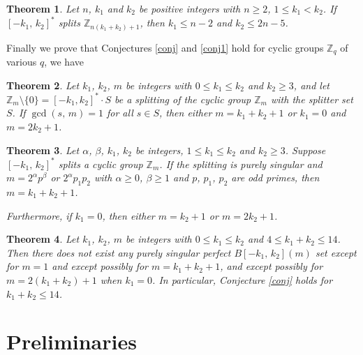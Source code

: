 \documentclass[12pt]{article}
\newtheorem{thm}{Theorem}[section]
\newtheorem{open problem}{Open problem}[section]
\begin{document}
\begin{thm} \label{thm1}
Let $n$, $k_1$ and $k_2$ be positive integers with $n\geq 2$, $1\leq k_1< k_2$.
If $[-k_1, \,k_2]^*$ splits $\mathbb{Z}_{n(k_1+k_2)+1}$,
then $k_1\leq n-2$ and $k_2\leq 2n-5$.
\end{thm}

Finally we prove that   Conjectures \ref{conj} and \ref{conj1} hold for  cyclic groups $\mathbb{Z}_q$ of various $q$, we have

\begin{thm} \label{primeB}
Let $k_1$, $k_2$, $m$ be integers with $0\leq k_1\leq k_2$ and $k_2\ge3$, and let $\mathbb{Z}_m\setminus \{0\}=[-k_1,k_2]^*\cdot S$ be a splitting of the cyclic group $\mathbb{Z}_m$ with the splitter set $S$. If $\gcd(s, \,m)=1$ for all $s\in S$, then either $m=k_1+k_2+1$ or $k_1=0$ and $m=2k_2+1$.
\end{thm}

\begin{thm} \label{finally-thm}
Let $\alpha$, $\beta$, $k_1$, $k_2$ be integers, $1\leq k_1\leq k_2$ and  $k_2\ge3$. %
Suppose $[-k_1, \,k_2]^*$ splits a cyclic group $\mathbb{Z}_{m}$.
If the splitting is purely singular and $m=2^{\alpha}p^{\beta}$ or $2^{\alpha}p_1p_2$
with $\alpha\geq 0$, $\beta\geq 1$ and $p$, $p_1$, $p_2$ are odd primes,
then $m=k_1+k_2+1$. %

Furthermore, if $k_1=0$, then either $m=k_2+1$ or $m=2k_2+1$.
\end{thm}


\begin{thm}Let $k_1$, $k_2$, $m$ be integers with $0\leq k_1\leq k_2$ and $4\le k_1+k_2\le14$. Then there does not exist any  purely singular perfect $B[-k_1, \,k_2](m)$ set except for $m = 1$  and except possibly for $m = k_1 + k_2 + 1$,  and except possibly for $m=2(k_1+k_2)+1$ when $k_1=0$. In particular,  Conjecture \ref{conj} holds for $k_1+k_2\le14$. \end{thm}




\section{Preliminaries}
\end{document}
